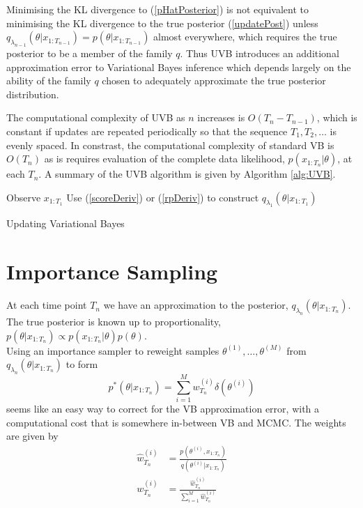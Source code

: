 \documentclass[12pt,a4paper]{article}\usepackage[]{graphicx}\usepackage[]{color}
\begin{document}
Minimising the KL divergence to (\ref{pHatPosterior}) is not equivalent to minimising the KL divergence to the true posterior (\ref{updatePost}) unless $q_{\lambda_{n-1}}(\theta |  x_{1:T_{n-1}}) = p(\theta |  x_{1:T_{n-1}})$ almost everywhere, which requires the true posterior to be a member of the family $q$. Thus UVB introduces an additional approximation error to Variational Bayes inference which depends largely on the ability of the family $q$ chosen to adequately approximate the true posterior distribution.

The computational complexity of UVB as $n$ increases is $O(T_{n} - T_{n-1})$, which is constant if updates are repeated periodically so that the sequence $T_1, T_2, \dots$ is evenly spaced. In constrast, the computational complexity of standard VB is $O(T_{n})$ as is requires evaluation of the complete data likelihood, $p(x_{1:T_{n}} | \theta)$, at each $T_{n}$. A summary of the UVB algorithm is given by Algorithm \ref{alg:UVB}.

\begin{algorithm}[H]
 Observe $x_{1:T_1}$\;
 Use (\ref{scoreDeriv}) or (\ref{rpDeriv}) to construct $q_{\lambda_1}(\theta | x_{1:T_1})$\;
 \caption{Updating Variational Bayes}
  \label{alg:UVB}
\end{algorithm}

\section{Importance Sampling}

At each time point $T_n$ we have an approximation to the posterior, $q_{\lambda_n}(\theta | x_{1:T_n})$. The true posterior is known up to proportionality, $p(\theta | x_{1:T_n}) \propto p(x_{1:T_n} | \theta)p(\theta)$. 
\\

Using an importance sampler to reweight samples $\theta^{(1)}, \dots, \theta^{(M)}$ from $q_{\lambda_n}(\theta | x_{1:T_n})$ to form 
\begin{equation}
\label{IS:Approx}
p^*(\theta | x_{1:T_n}) = \sum_{i=1}^M w^{(i)}_{T_n} \delta(\theta^{(i)})
\end{equation}
seems like an easy way to correct for the VB approximation error, with a computational cost that is somewhere in-between VB and MCMC. The weights are given by
\begin{align}
\hat{w}^{(i)}_{T_n} &= \frac{p(\theta^{(i)}, x_{1:T_n})}{q(\theta^{(i)} | x_{1:T_n})} \label{IS:Weights} \\
w^{(i)}_{T_n} &= \frac{\hat{w}^{(i)}_{T_n}}{\sum_{i=1}^M \hat{w}^{(i)}_{T_n}} \label{IS:WeightsNorm}
\end{align}
\\
\end{document}
